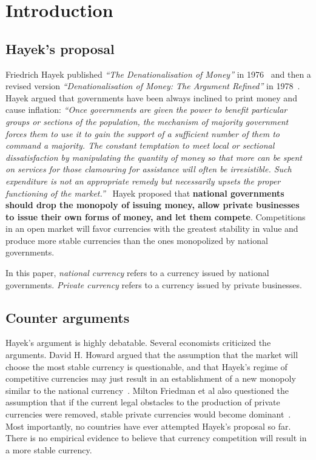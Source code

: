 \documentclass[dvipdfmx,a4paper]{article}
\begin{document}
\section{Introduction}

\subsection{Hayek's proposal}

Friedrich Hayek published \textit{``The Denationalisation of Money''} in 1976~\cite{hayekbook2} and then a revised version \textit{``Denationalisation of Money: The Argument Refined''} in 1978~\cite{hayekbook}. Hayek argued that governments have been always inclined to print money and cause inflation: \textit{``Once governments are given the power to benefit particular groups or sections of the population, the mechanism of majority government forces them to use it to gain the support of a sufficient number of them to command a majority. The constant temptation to meet local or sectional dissatisfaction by manipulating the quantity of money so that more can be spent on services for those clamouring for assistance will often be irresistible. Such expenditure is not an appropriate remedy but necessarily upsets the proper functioning of the market.''}~\cite{hayekbook} Hayek proposed that \textbf{national governments should drop the monopoly of issuing money, allow private businesses to issue their own forms of money, and let them compete}. Competitions in an open market will favor currencies with the greatest stability in value and produce more stable currencies than the ones monopolized by national governments.

In this paper, \textit{national currency} refers to a currency issued by national governments. \textit{Private currency} refers to a currency issued by private businesses.

\subsection{Counter arguments}

Hayek's argument is highly debatable. Several economists criticized the arguments. David H. Howard argued that the assumption that the market will choose the most stable currency is questionable, and that Hayek's regime of competitive currencies may just result in an establishment of a new monopoly similar to the national currency~\cite{howard1977denationalization}. Milton Friedman et al also questioned the assumption that if the current legal obstacles to the production of private currencies were removed, stable private currencies would become dominant~\cite{friedman1986has}. Most importantly, no countries have ever attempted Hayek's proposal so far. There is no empirical evidence to believe that currency competition will result in a more stable currency.
\end{document}

